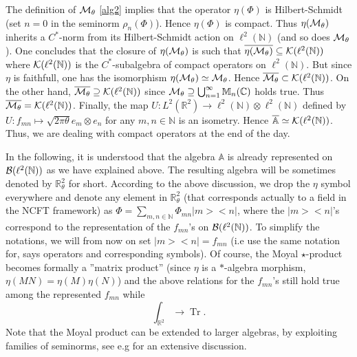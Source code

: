 \documentclass[a4paper,11pt,twoside]{article}
\numberwithin{equation}{section}
\DeclareMathOperator{\tr}{Tr}
\theoremstyle{nonumberplain}
\newcounter{and}
\begin{document}
The definition of ${\cal{M}}_\theta$ \eqref{alg2} implies that the operator $\eta(\Phi)$ is Hilbert-Schmidt (set $n=0$ in the seminorm $\rho_n(\Phi)$). Hence $\eta(\Phi)$ is compact. Thus $\eta({\cal{M}}_\theta)$ inherits a $C^*$-norm from its Hilbert-Schmidt action on $\ell^2(\mathbb{N})$ (and so does ${\cal{M}}_\theta$). One concludes that the closure of $\eta({\cal{M}}_\theta)$ is such that $\overline{\eta({\cal{M}}_\theta)}\subseteq{\cal{K}}(\ell^2(\mathbb{N}))$ where ${\cal{K}}(\ell^2(\mathbb{N}))$ is the $C^*$-subalgebra of compact operators on $\ell^2(\mathbb{N})$. But since $\eta$ is faithfull, one has the isomorphism $\eta({\cal{M}}_\theta)\simeq{\cal{M}}_\theta$. Hence $\overline{{\cal{M}}_\theta}\subset{\cal{K}}(\ell^2(\mathbb{N}))$. On the other hand, $\overline{{\cal{M}}_\theta}\supseteq{\cal{K}}(\ell^2(\mathbb{N}))$ since ${\cal{M}}_\theta\supseteq\bigcup_{n=1}^\infty{\mathbb{M}}_n(\mathbb{C})$ holds true. Thus $\overline{{\cal{M}}_\theta}={\cal{K}}(\ell^2(\mathbb{N}))$. Finally, the map $U:L^2(
\mathbb{R}^2)\to\ell^2(\mathbb{N})\otimes\ell^2(\mathbb{N})$ defined by $U:f_{mn}\mapsto {\sqrt{2\pi\theta}}e_m\otimes e_n$ for any $m,n\in\mathbb{N}$ is an isometry. Hence $\overline{{\mathbb{A}}}\simeq{\cal{K}}(\ell^2(\mathbb{N}))$. Thus, we are dealing with compact operators at the end of the day.\par

In the following, it is understood that the algebra ${\mathbb{A}}$ is already represented on ${\cal{B}}(\ell^2(\mathbb{N}))$ as we have explained above. The resulting algebra will be sometimes denoted by $\mathbb{R}^2_\theta$ for short. According to the above discussion, we drop the $\eta$ symbol everywhere and denote any element in $\mathbb{R}^2_\theta$ (that corresponds actually to a field in the NCFT framework) as $\Phi=\sum_{m,n\in\mathbb{N}}\Phi_{mn}|m><n|$, where the $|m><n|$'s correspond to the representation of the $f_{mn}$'s on ${\cal{B}}(\ell^2(\mathbb{N}))$. To simplify the notations, we will from now on set $|m><n|=f_{mn}$ (i.e use the same notation for, says operators and corresponding symbols). Of course, the Moyal $\star$-product becomes formally a ''matrix product'' (since $\eta$ is a $*$-algebra morphism, $\eta(MN)=\eta(M)\eta(N)$) and the above relations for the $f_{mn}$'s still hold true among the represented $f_{mn}$ while 
\begin{equation}
\int_{\mathbb{R}^2}\to\tr. \nonumber
\end{equation}
Note that the Moyal product can be extended to larger algebras, by exploiting families of seminorms, see e.g \cite{Gracia-Bondia:1987kw} for an extensive discussion.\par
\end{document}
